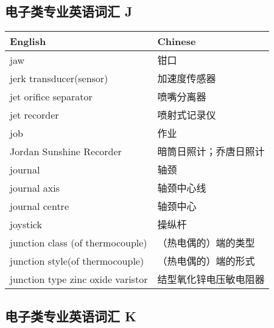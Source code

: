 \documentclass[
]{article}
\begin{document}
\hypertarget{ux7535ux5b50ux7c7bux4e13ux4e1aux82f1ux8bedux8bcdux6c47-j}{%
\subsection{\texorpdfstring{电子类专业英语词汇 J
}{电子类专业英语词汇 J }}\label{ux7535ux5b50ux7c7bux4e13ux4e1aux82f1ux8bedux8bcdux6c47-j}}

\begin{longtable}[]{@{}ll@{}}
\toprule()
English & Chinese \\
\midrule()
\endhead
jaw & 钳口 \\
jerk transducer(sensor) & 加速度传感器 \\
jet orifice separator & 喷嘴分离器 \\
jet recorder & 喷射式记录仪 \\
job & 作业 \\
Jordan Sunshine Recorder & 暗筒日照计；乔唐日照计 \\
journal & 轴颈 \\
journal axis & 轴颈中心线 \\
journal centre & 轴颈中心 \\
joystick & 操纵杆 \\
junction class (of thermocouple) & （热电偶的）端的类型 \\
junction style(of thermocouple) & （热电偶的）端的形式 \\
junction type zinc oxide varistor & 结型氧化锌电压敏电阻器 \\
\bottomrule()
\end{longtable}

\hypertarget{ux7535ux5b50ux7c7bux4e13ux4e1aux82f1ux8bedux8bcdux6c47-k}{%
\subsection{\texorpdfstring{电子类专业英语词汇 K
}{电子类专业英语词汇 K }}\label{ux7535ux5b50ux7c7bux4e13ux4e1aux82f1ux8bedux8bcdux6c47-k}}
\end{document}

